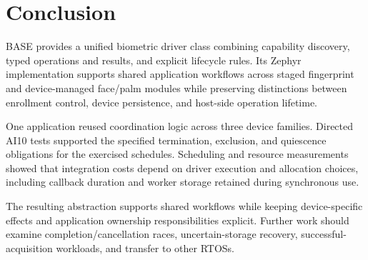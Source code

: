 \section{Conclusion}
\label{sec:conclusion}

BASE provides a unified biometric driver class combining capability discovery, typed operations and results, and explicit lifecycle rules. Its Zephyr implementation supports shared application workflows across staged fingerprint and device-managed face/palm modules while preserving distinctions between enrollment control, device persistence, and host-side operation lifetime.

One application reused coordination logic across three
device families. Directed AI10 tests supported the specified
termination, exclusion, and quiescence obligations for the
exercised schedules. Scheduling and resource measurements
showed that integration costs depend on driver execution
and allocation choices, including callback duration and
worker storage retained during synchronous use.

The resulting abstraction supports shared workflows while
keeping device-specific effects and application ownership
responsibilities explicit. Further work should examine
completion/cancellation races, uncertain-storage recovery,
successful-acquisition workloads, and transfer to other RTOSs.